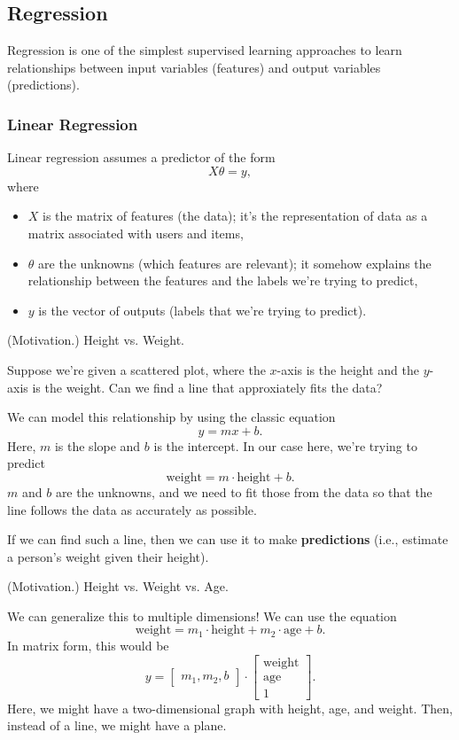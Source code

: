 \documentclass[letterpaper]{article}
\begin{document}
\subsection{Regression}
Regression is one of the simplest supervised learning approaches to learn relationships between input variables (features) and output variables (predictions).

\subsubsection{Linear Regression}
Linear regression assumes a predictor of the form \[X\theta = y,\] where 
\begin{itemize}
    \item $X$ is the matrix of features (the data); it's the representation of data as a matrix associated with users and items,
    \item $\theta$ are the unknowns (which features are relevant); it somehow explains the relationship between the features and the labels we're trying to predict,
    \item $y$ is the vector of outputs (labels that we're trying to predict).
\end{itemize}

\begin{mdframed}[]
    (Motivation.) Height vs. Weight. 

    \bigskip 

    Suppose we're given a scattered plot, where the $x$-axis is the height and the $y$-axis is the weight. Can we find a line that approxiately fits the data? 

    \bigskip 

    We can model this relationship by using the classic equation \[y = mx + b.\] Here, $m$ is the slope and $b$ is the intercept. In our case here, we're trying to predict \[\text{weight} = m \cdot \text{height} + b.\] $m$ and $b$ are the unknowns, and we need to fit those from the data so that the line follows the data as accurately as possible. 

    \bigskip 

    If we can find such a line, then we can use it to make \textbf{predictions} (i.e., estimate a person's weight given their height).
\end{mdframed}


\begin{mdframed}[]
    (Motivation.) Height vs. Weight vs. Age. 

    \bigskip 

    We can generalize this to multiple dimensions! We can use the equation 
    \[\text{weight} = m_1 \cdot \text{height} + m_2 \cdot \text{age} + b.\] 
    In matrix form, this would be 
    \[y = \begin{bmatrix}
        m_1, m_2, b
    \end{bmatrix} \cdot \begin{bmatrix}
        \text{weight} \\ \text{age} \\ 1
    \end{bmatrix}.\]
    Here, we might have a two-dimensional graph with height, age, and weight. Then, instead of a line, we might have a plane. 
\end{mdframed}
\end{document}
